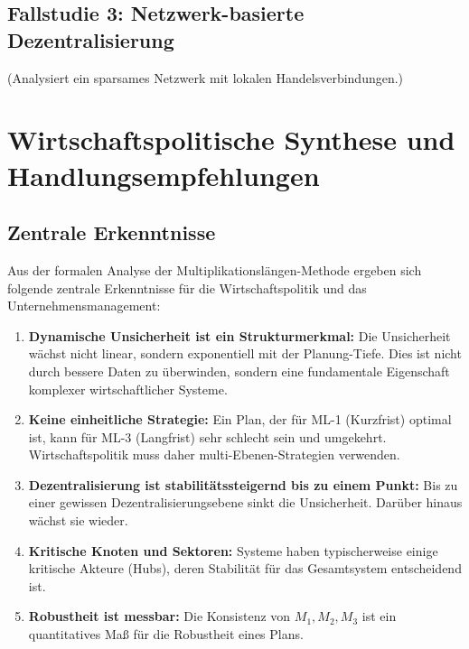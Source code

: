 \documentclass[a4paper,12pt]{article}
\theoremstyle{definition}
\begin{document}
\subsection{Fallstudie 3: Netzwerk-basierte Dezentralisierung}

(Analysiert ein sparsames Netzwerk mit lokalen Handelsverbindungen.)

\section{Wirtschaftspolitische Synthese und Handlungsempfehlungen}

\subsection{Zentrale Erkenntnisse}

Aus der formalen Analyse der Multiplikationslängen-Methode ergeben sich folgende zentrale Erkenntnisse für die Wirtschaftspolitik und das Unternehmensmanagement:

\begin{enumerate}

\item \textbf{Dynamische Unsicherheit ist ein Strukturmerkmal:} Die Unsicherheit wächst nicht linear, sondern exponentiell mit der Planung-Tiefe. Dies ist nicht durch bessere Daten zu überwinden, sondern eine fundamentale Eigenschaft komplexer wirtschaftlicher Systeme.

\item \textbf{Keine einheitliche Strategie:} Ein Plan, der für ML-1 (Kurzfrist) optimal ist, kann für ML-3 (Langfrist) sehr schlecht sein und umgekehrt. Wirtschaftspolitik muss daher multi-Ebenen-Strategien verwenden.

\item \textbf{Dezentralisierung ist stabilitätssteigernd bis zu einem Punkt:} Bis zu einer gewissen Dezentralisierungsebene sinkt die Unsicherheit. Darüber hinaus wächst sie wieder.

\item \textbf{Kritische Knoten und Sektoren:} Systeme haben typischerweise einige kritische Akteure (Hubs), deren Stabilität für das Gesamtsystem entscheidend ist.

\item \textbf{Robustheit ist messbar:} Die Konsistenz von $M_1, M_2, M_3$ ist ein quantitatives Maß für die Robustheit eines Plans.

\end{enumerate}
\end{document}
